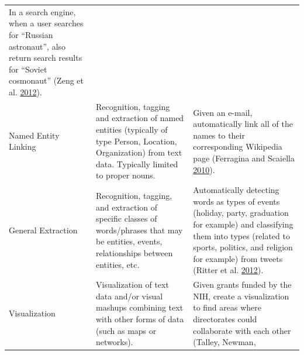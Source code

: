 \documentclass[]{krantz}
\begin{document}
\begin{longtable}[]{@{}lll@{}}
\begin{minipage}[t]{0.63\columnwidth}
In a search engine, when a user searches for ``Russian astronaut'', also
return search results for ``Soviet cosmonaut'' (Zeng et al.
\protect\hyperlink{ref-Zeng-2012}{2012}).\strut
\end{minipage}\tabularnewline
\begin{minipage}[t]{0.12\columnwidth}\raggedright\strut
Named Entity Linking\strut
\end{minipage} & \begin{minipage}[t]{0.16\columnwidth}\raggedright\strut
Recognition, tagging and extraction of named entities (typically of type
Person, Location, Organization) from text data. Typically limited to
proper nouns.\strut
\end{minipage} & \begin{minipage}[t]{0.63\columnwidth}\raggedright\strut
Given an e-mail, automatically link all of the names to their
corresponding Wikipedia page (Ferragina and Scaiella
\protect\hyperlink{ref-ferragina-10}{2010}).\strut
\end{minipage}\tabularnewline
\begin{minipage}[t]{0.12\columnwidth}\raggedright\strut
General Extraction\strut
\end{minipage} & \begin{minipage}[t]{0.16\columnwidth}\raggedright\strut
Recognition, tagging, and extraction of specific classes of
words/phrases that may be entities, events, relationships between
entities, etc.\strut
\end{minipage} & \begin{minipage}[t]{0.63\columnwidth}\raggedright\strut
Automatically detecting words as types of events (holiday, party,
graduation for example) and classifying them into types (related to
sports, politics, and religion for example) from tweets (Ritter et al.
\protect\hyperlink{ref-Ritter2012}{2012}).\strut
\end{minipage}\tabularnewline
\begin{minipage}[t]{0.12\columnwidth}\raggedright\strut
Visualization\strut
\end{minipage} & \begin{minipage}[t]{0.16\columnwidth}\raggedright\strut
Visualization of text data and/or visual mashups combining text with
other forms of data (such as maps or networks).\strut
\end{minipage} & \begin{minipage}[t]{0.63\columnwidth}\raggedright\strut
Given grants funded by the NIH, create a visualization to find areas
where directorates could collaborate with each other (Talley, Newman,

\end{minipage}
\end{longtable}
\end{document}
